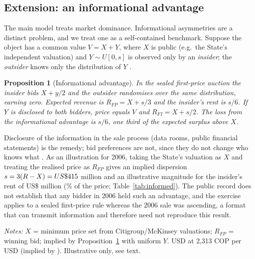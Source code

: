\documentclass[12pt,a4paper]{article}
\newtheorem{proposition}{Proposition}
\theoremstyle{definition}
\theoremstyle{remark}
\newcommand{\us}{US\$}
\begin{document}
\subsection{Extension: an informational advantage}\label{sec:insider}

The main model treats market dominance. Informational asymmetries are a distinct problem, and we treat one as a self-contained benchmark. Suppose the object has a common value $V=X+Y$, where $X$ is public (e.g.\ the State's independent valuation) and $Y\sim U[0,s]$ is observed only by an \emph{insider}; the \emph{outsider} knows only the distribution of $Y$ \citep{emw1983}.

\begin{proposition}[Informational advantage]\label{prop:insider}
In the sealed first-price auction the insider bids $X+y/2$ and the outsider randomises over the same distribution, earning zero. Expected revenue is $R_{FP}=X+s/3$ and the insider's rent is $s/6$. If $Y$ is disclosed to both bidders, price equals $V$ and $R_{FI}=X+s/2$. The loss from the informational advantage is $s/6$, one third of the expected surplus above $X$.
\end{proposition}

Disclosure of the information in the sale process (data rooms, public financial statements) is the remedy; bid preferences are not, since they do not change who knows what \citep{milgromweber1982}. As an illustration for 2006, taking the State's valuation as $X$ and treating the realised price as $R_{FP}$ gives an implied dispersion $s=3(R-X)=\us\coltelS{}$ million and an illustrative magnitude for the insider's rent of \us\coltelLossUSD{} million (\coltelLossPct\% of the price; Table~\ref{tab:informed}). The public record does not establish that any bidder in 2006 held such an advantage, and the exercise applies to a sealed first-price rule whereas the 2006 sale was ascending, a format that can transmit information and therefore need not reproduce this result.

\begin{table}[!htbp]
\centering\small
\caption{Illustrative cost of an informational advantage, COLTEL 2006}\label{tab:informed}

\par\vspace{2pt}\footnotesize\textit{Notes:} $X$ = minimum price set from Citigroup/McKinsey valuations; $R_{FP}$ = winning bid; implied by Proposition~\ref{prop:insider} with uniform $Y$. USD at 2,313 COP per USD (implied by \citealt{infobae2006}). Illustrative only, see text.
\end{table}
\end{document}
